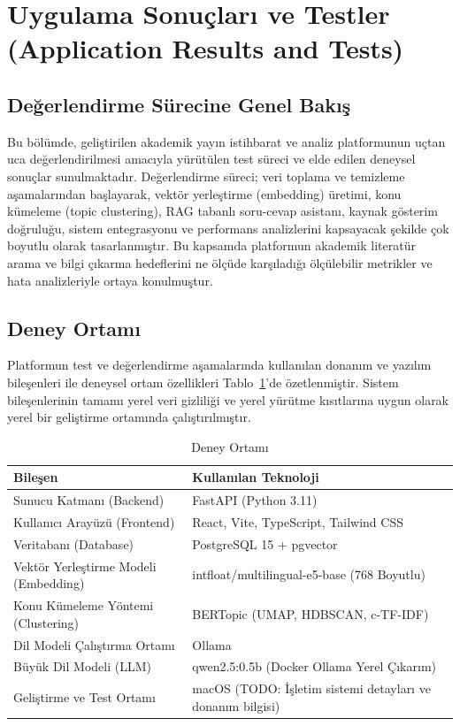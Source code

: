 \section{Uygulama Sonuçları ve Testler (Application Results and Tests)}

\subsection{Değerlendirme Sürecine Genel Bakış}
Bu bölümde, geliştirilen akademik yayın istihbarat ve analiz platformunun uçtan uca değerlendirilmesi amacıyla yürütülen test süreci ve elde edilen deneysel sonuçlar sunulmaktadır. Değerlendirme süreci; veri toplama ve temizleme aşamalarından başlayarak, vektör yerleştirme (embedding) üretimi, konu kümeleme (topic clustering), RAG tabanlı soru-cevap asistanı, kaynak gösterim doğruluğu, sistem entegrasyonu ve performans analizlerini kapsayacak şekilde çok boyutlu olarak tasarlanmıştır. Bu kapsamda platformun akademik literatür arama ve bilgi çıkarma hedeflerini ne ölçüde karşıladığı ölçülebilir metrikler ve hata analizleriyle ortaya konulmuştur.

\subsection{Deney Ortamı}
Platformun test ve değerlendirme aşamalarında kullanılan donanım ve yazılım bileşenleri ile deneysel ortam özellikleri Tablo~\ref{tab:deney_ortami}'de özetlenmiştir. Sistem bileşenlerinin tamamı yerel veri gizliliği ve yerel yürütme kısıtlarına uygun olarak yerel bir geliştirme ortamında çalıştırılmıştır.

\begin{table}[H]
\centering
\caption{Deney Ortamı}
\label{tab:deney_ortami}
\begin{tabular}{ll}
\hline
Bileşen & Kullanılan Teknoloji \\
\hline
Sunucu Katmanı (Backend) & FastAPI (Python 3.11) \\
Kullanıcı Arayüzü (Frontend) & React, Vite, TypeScript, Tailwind CSS \\
Veritabanı (Database) & PostgreSQL 15 + pgvector \\
Vektör Yerleştirme Modeli (Embedding) & intfloat/multilingual-e5-base (768 Boyutlu) \\
Konu Kümeleme Yöntemi (Clustering) & BERTopic (UMAP, HDBSCAN, c-TF-IDF) \\
Dil Modeli Çalıştırma Ortamı & Ollama \\
Büyük Dil Modeli (LLM) & qwen2.5:0.5b (Docker Ollama Yerel Çıkarım) \\
Geliştirme ve Test Ortamı & macOS (TODO: İşletim sistemi detayları ve donanım bilgisi) \\
\hline
\end{tabular}
\end{table}

